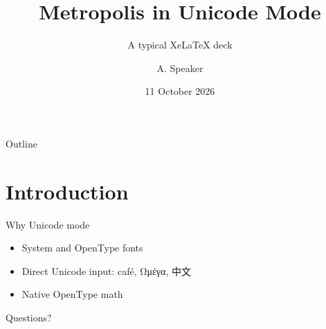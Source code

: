\documentclass[10pt]{beamer}
\title{Metropolis in Unicode Mode}
\subtitle{A typical XeLaTeX deck}
\author{A. Speaker}
\date{11 October 2026}
\begin{document}
\maketitle
\begin{frame}{Outline}\tableofcontents\end{frame}
\section{Introduction}
\begin{frame}{Why Unicode mode}
\begin{itemize}
\item<1-> System and OpenType fonts
\item<2-> Direct Unicode input: café, Ωμέγα, 中文
\item<3-> \alert{Native} OpenType math
\end{itemize}
\end{frame}
\begin{frame}[standout]Questions?\end{frame}
\end{document}
